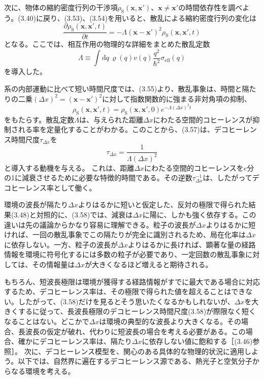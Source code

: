 次に、物体の縮約密度行列の干渉項$\rho_{\mathrm S}(\bm x,\bm x')$、$\bm x\ne\bm x'$の時間依存性を調べよう。(3.40)に戻り、(3.53)、(3.54)を用いると、散乱による縮約密度行列の変化は
\begin{equation}
\frac{\partial\rho_{\mathrm S}(\bm x,\bm x',t)}{\partial t}=-\Lambda(\bm x-\bm x')^2\rho_{\mathrm S}(\bm x,\bm x',t)
\tag{3.55}
\end{equation}
となる。ここでは、相互作用の物理的な詳細をまとめた散乱定数
\begin{equation}
\Lambda\equiv\int\mathrm dq\,\varrho(q)v(q)\frac{q^2}{\hbar^2}\sigma_{\mathrm{eff}}(q)
\tag{3.56}
\end{equation}
を導入した。

系の内部運動に比べて短い時間尺度では、(3.55)より、散乱事象は、時間と隔たりの二乗$(\Delta x)^2=(\bm x-\bm x')^2$に対して指数関数的に強まる非対角項の抑制、
\begin{equation}
\rho_{\mathrm S}(\bm x,\bm x',t)=\rho_{\mathrm S}(\bm x,\bm x',0)e^{-\Lambda(\Delta x)^2t}
\tag{3.57}
\end{equation}
をもたらす。散乱定数$\Lambda$は、与えられた距離$\Delta x$にわたる空間的コヒーレンスが抑制される率を定量化することがわかる。このことから、(3.57)は、デコヒーレンス時間尺度$\tau_{\Delta x}$を
\begin{equation}
\tau_{\Delta x}=\frac{1}{\Lambda(\Delta x)^2}
\tag{3.58}
\end{equation}
と導入する動機を与える。
\hypertarget{srcpage:132}{}\label{srcpage:132}
これは、距離$\Delta x$にわたる空間的コヒーレンスを$e$分の1に減衰させるために必要な特徴的時間である。その逆数$\tau_{\Delta x}^{-1}$は、したがってデコヒーレンス率として働く。

環境の波長が隔たり$\Delta x$よりはるかに短いと仮定した、反対の極限で得られた結果(3.48)と対照的に、(3.58)では、減衰は$\Delta x$に陽に、しかも強く依存する。この違いは先の議論からかなり容易に理解できる。粒子の波長が$\Delta x$よりはるかに短ければ、一回の散乱事象でこの隔たりが完全に識別されるため、局在化率は$\Delta x$に依存しない。一方、粒子の波長が$\Delta x$よりはるかに長ければ、顕著な量の経路情報を環境に符号化するには多数の粒子が必要であり、一定回数の散乱事象に対しては、その情報量は$\Delta x$が大きくなるほど増えると期待される。

もちろん、短波長極限は環境が獲得する経路情報がすでに最大である場合に対応するため、デコヒーレンス率は、その極限で得られた値を超えることはできない。したがって、(3.58)だけを見るとそう思いたくなるかもしれないが、$\Delta x$を大きくするに従って、長波長極限のデコヒーレンス時間尺度(3.58)が際限なく短くなることはない。どこかで$\Delta x$は環境の典型的な波長より大きくなる。その場合、長波長の仮定が破れ、代わりに短波長の場合を考える必要がある。この場合、確かにデコヒーレンス率は、隔たり$\Delta x$に依存しない値に飽和する［(3.46)参照］。
次に、デコヒーレンス模型を、関心のある具体的な物理的状況に適用しよう。以下では、自然界に遍在するデコヒーレンス源である、熱光子と空気分子からなる環境を考える。

